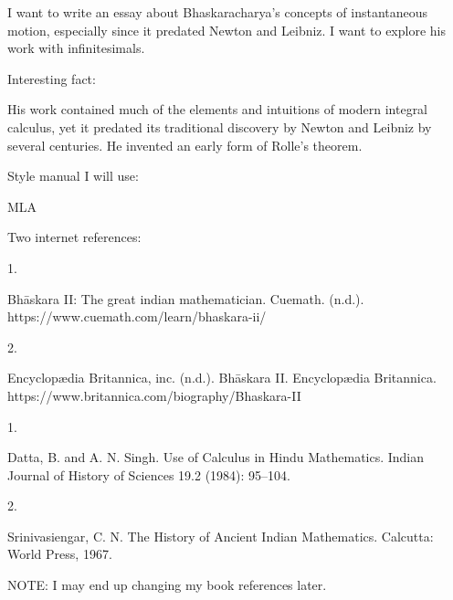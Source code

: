 \documentclass{article}
\begin{document}
I want to write an essay about Bhaskaracharya's concepts of instantaneous
motion, especially since it predated Newton and Leibniz.
I want to explore his work with infinitesimals.


Interesting fact:

His work contained much of the elements and intuitions of modern
integral calculus, yet it predated its traditional discovery by Newton and Leibniz
by several centuries.
He invented an early form of Rolle's theorem.

Style manual I will use:

MLA

Two internet references:

1.

Bhāskara II: The great indian mathematician. Cuemath. (n.d.). https://www.cuemath.com/learn/bhaskara-ii/ 

2.

Encyclopædia Britannica, inc. (n.d.). Bhāskara II. Encyclopædia Britannica. https://www.britannica.com/biography/Bhaskara-II 

1.

Datta, B. and A. N. Singh. Use of Calculus in Hindu Mathematics. Indian Journal of History of Sciences 19.2 (1984): 95–104.

2.

Srinivasiengar, C. N. The History of Ancient Indian Mathematics. Calcutta: World Press, 1967.


NOTE: I may end up changing my book references later.
\end{document}
